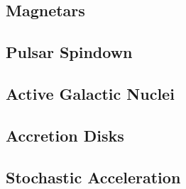 \subsection{Magnetars}
\label{sub:magnetars}



\subsection{Pulsar Spindown}
\label{sub:spindown}



\subsection{Active Galactic Nuclei}
\label{sub:nuclei}



\subsection{Accretion Disks}
\label{sub:accretion}



\subsection{Stochastic Acceleration}
\label{sub:acceleration}
